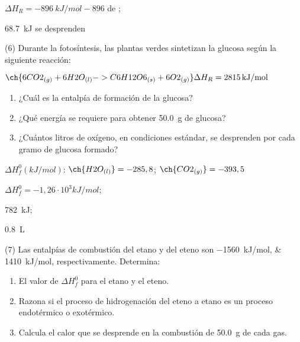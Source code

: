 \documentclass[10pt]{article}
\newenvironment{gexdatos}{
      \noindent\makebox[0pt][r]{\textit{Datos:}}
    }{\vspace{5pt}}
\begin{document}
\begin{multicols}{2}
\begin{solution}
  \begin{enumerate*}
    \item \( \Delta H_R = \SI{-896}{kJ/mol}-896 \) de ;
    \item \SI{68.7}{kJ} se desprenden
  \end{enumerate*}
\end{solution}




\begin{exercise}[
    tags    = {},
    topics  = {química, termodinámica, termoquímica},
    source  = {FQ 1B MGH 2016, p179, e6},
  ]
  (6) Durante la fotosíntesis, las plantas verdes sintetizan la glucosa
  según la siguiente reacción:

  \( \ch{6 CO2_{(g)} + 6 H2O_{(l)} -> C6H12O6_{(s)} + 6 O2_{(g)}} \Delta H_R = \SI{2815}{kJ/mol} \)

  \begin{enumerate}
    \item ¿Cuál es la entalpía de formación de la glucosa?
    \item ¿Qué energía se requiere para obtener \SI{50.0}{\gram} de glucosa?
    \item ¿Cuántos litros de oxígeno, en condiciones estándar, se desprenden por cada gramo de glucosa formado?
  \end{enumerate}

  \begin{gexdatos}
    \( \Delta H^0_f (\si{kJ/mol}) \): \( \ch{H2O_{(l)}} = -285,8 \); \( \ch    {CO2_{(g)}} = -393,5 \)
  \end{gexdatos}
\end{exercise}

\begin{solution}
  \begin{enumerate*}
    \item \( \Delta H^0_f = -1,26·10^3 kJ/mol \);
    \item \SI{782}{kJ};
    \item \SI{0.8}{\liter}
  \end{enumerate*}
\end{solution}




\begin{exercise}[
    tags    = {},
    topics  = {química, termodinámica, termoquímica},
    source  = {FQ 1B MGH 2016, p179, e7},
  ]
  (7) Las entalpías de combustión del etano y del eteno son
  \SIlist{-1560;1410}{kJ/mol}, respectivamente. Determina:
  \begin{enumerate}
    \item El valor de \( \Delta H^0_f \) para el etano y el eteno.
    \item Razona si el proceso de hidrogenación del eteno a etano
    es un proceso endotérmico o exotérmico.
    \item Calcula el calor que se desprende en la combustión de
    \SI{50.0}{\gram} de cada gas.
  \end{enumerate}


\end{exercise}
\end{multicols}
\end{document}
